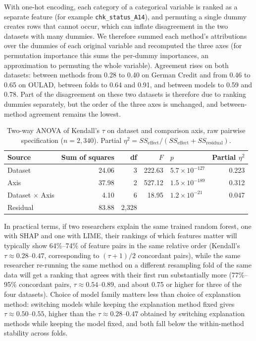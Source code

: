 \documentclass[11pt,twoside,a4paper]{article}
\begin{document}
With one-hot encoding, each category of a categorical variable is ranked as a separate feature (for example \texttt{chk\_status\_A14}), and permuting a single dummy creates rows that cannot occur, which can inflate disagreement in the two datasets with many dummies. We therefore summed each method's attributions over the dummies of each original variable and recomputed the three axes (for permutation importance this sums the per-dummy importances, an approximation to permuting the whole variable). Agreement rises on both datasets: between methods from 0.28 to 0.40 on German Credit and from 0.46 to 0.65 on OULAD, between folds to 0.64 and 0.91, and between models to 0.59 and 0.78. Part of the disagreement on these two datasets is therefore due to ranking dummies separately, but the order of the three axes is unchanged, and between-method agreement remains the lowest.

\begin{table}[h]
\centering
\caption{Two-way ANOVA of Kendall's $\tau$ on dataset and comparison axis, raw pairwise specification ($n=2{,}340$). Partial $\eta^2 = SS_{\text{effect}}/(SS_{\text{effect}}+SS_{\text{residual}})$.}
\label{tab:anova}
\begin{tabular}{lrrrlr}
\toprule
Source & Sum of squares & df & $F$ & $p$ & Partial $\eta^2$ \\
\midrule
Dataset            & 24.06 & 3    & 222.63 & $5.7\times10^{-127}$ & 0.223 \\
Axis               & 37.98 & 2    & 527.12 & $1.5\times10^{-189}$ & 0.312 \\
Dataset $\times$ Axis & 4.10 & 6    & 18.95  & $1.2\times10^{-21}$ & 0.047 \\
Residual           & 83.88 & 2{,}328 &        &     &     \\
\bottomrule
\end{tabular}
\end{table}

In practical terms, if two researchers explain the same trained random forest, one with SHAP and one with LIME, their rankings of which features matter will typically show 64\%--74\% of feature pairs in the same relative order (Kendall's $\tau \approx 0.28\text{--}0.47$, corresponding to $(\tau+1)/2$ concordant pairs), while the same researcher re-running the same method on a different resampling fold of the same data will get a ranking that agrees with their first run substantially more (77\%--95\% concordant pairs, $\tau \approx 0.54\text{--}0.89$, and about 0.75 or higher for three of the four datasets). Choice of model family matters less than choice of explanation method: switching models while keeping the explanation method fixed gives $\tau \approx 0.50\text{--}0.55$, higher than the $\tau \approx 0.28\text{--}0.47$ obtained by switching explanation methods while keeping the model fixed, and both fall below the within-method stability across folds.
\end{document}
